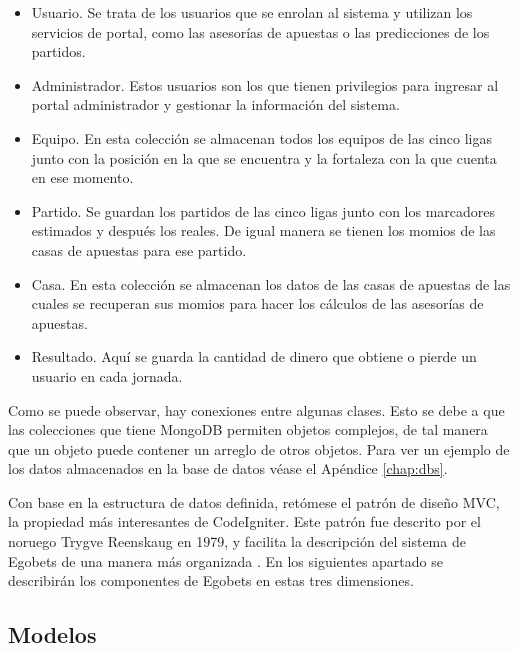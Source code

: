	\begin{itemize}
		\item Usuario. Se trata de los usuarios que se enrolan al sistema y utilizan los servicios de portal, como las asesorías de apuestas o las predicciones de los partidos.
		\item Administrador. Estos usuarios son los que tienen privilegios para ingresar al portal administrador y gestionar la información del sistema.
		\item Equipo. En esta colección se almacenan todos los equipos de las cinco ligas junto con la posición en la que se encuentra  y la fortaleza con la que cuenta en ese momento.
		\item Partido. Se guardan los partidos de las cinco ligas junto con los marcadores estimados y después los reales. De igual manera se tienen los momios de las casas de apuestas para ese partido.
		\item Casa. En esta colección se almacenan los datos de las casas de apuestas de las cuales se recuperan sus momios para hacer los cálculos de las asesorías de apuestas.
		\item Resultado. Aquí se guarda la cantidad de dinero que obtiene o pierde un usuario en cada jornada.
	\end{itemize}
	Como se puede observar, hay conexiones entre algunas clases. Esto se debe a que las colecciones que tiene MongoDB permiten objetos complejos, de tal manera que un objeto puede contener un arreglo de otros objetos. Para ver un ejemplo de los datos almacenados en la base de datos véase el Apéndice \ref{chap:dbs}.

	Con base en la estructura de datos definida, retómese el patrón de diseño MVC, la propiedad más interesantes de CodeIgniter. Este patrón fue descrito por el noruego Trygve Reenskaug en 1979, y facilita la descripción del sistema de Egobets de una manera más organizada \cite{upton2007codeigniter} \cite{alfredo2005ingenieria}. En los siguientes apartado se describirán  los componentes de Egobets en estas tres dimensiones.


		 \subsection{Modelos}

